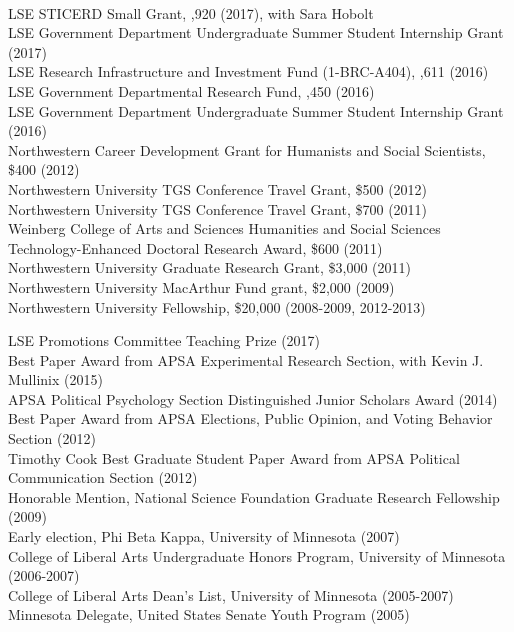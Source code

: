 \documentclass[12pt]{article}
\renewcommand{\section}[1]{\pagebreak[3]%
    \llap{\scshape\smash{\parbox[t]{\marginparwidth}{\raggedright {\color{lg}#1}}}}%
    \vspace{-\baselineskip}\par}
\newcommand{\topic}[1]{\pagebreak[3]\indent {\color{lg}{\footnotesize #1 }}\\}
\newcommand{\entry}[1]{\indent {\color{lg}\guillemotright}\hspace{2pt}#1\vspace{.25em}\\}
\begin{document}
	\topic{Institutional Sources}
	\entry{LSE STICERD Small Grant, ,920 (2017), with Sara Hobolt}
    \entry{LSE Government Department Undergraduate Summer Student Internship Grant (2017)}
    \entry{LSE Research Infrastructure and Investment Fund (1-BRC-A404), \textsterling 11,611 (2016)}
	\entry{LSE Government Departmental Research Fund, ,450 (2016)}
	\entry{LSE Government Department Undergraduate Summer Student Internship Grant (2016)}
	\entry{Northwestern Career Development Grant for Humanists and Social Scientists, \$400 (2012)}
	\entry{Northwestern University TGS Conference Travel Grant, \$500 (2012)}
	\entry{Northwestern University TGS Conference Travel Grant, \$700 (2011)}
	\entry{Weinberg College of Arts and Sciences Humanities and Social Sciences Technology-Enhanced Doctoral Research Award, \$600 (2011)}
	\entry{Northwestern University Graduate Research Grant, \$3,000 (2011)}
	\entry{Northwestern University MacArthur Fund grant, \$2,000 (2009)}
	\entry{Northwestern University Fellowship, \$20,000 (2008-2009, 2012-2013)}

\section{Honors \&\\Awards}
	\entry{LSE Promotions Committee Teaching Prize (2017)}
    \entry{Best Paper Award from APSA Experimental Research Section, with Kevin J. Mullinix (2015)}
	\entry{APSA Political Psychology Section Distinguished Junior Scholars Award (2014)}
	\entry{Best Paper Award from APSA Elections, Public Opinion, and Voting Behavior Section (2012)}
	\entry{Timothy Cook Best Graduate Student Paper Award from APSA Political Communication Section (2012)}
	\entry{Honorable Mention, National Science Foundation Graduate Research Fellowship (2009)}
	\entry{Early election, Phi Beta Kappa, University of Minnesota (2007)}
	\entry{College of Liberal Arts Undergraduate Honors Program, University of Minnesota (2006-2007)}
	\entry{College of Liberal Arts Dean's List, University of Minnesota (2005-2007)}
	\entry{Minnesota Delegate, United States Senate Youth Program (2005)}
\end{document}

